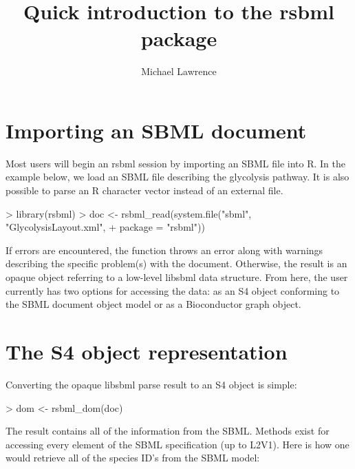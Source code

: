 \documentclass[english]{article}
\begin{document}
\title{Quick introduction to the rsbml package}
\author{Michael Lawrence}

\maketitle

\section*{Importing an SBML document}
Most users will begin an rsbml session by importing an SBML file into R.
In the example below, we load an SBML file describing the glycolysis pathway.
It is also possible to parse an R character vector instead of an external file.

\begin{Schunk}
\begin{Sinput}
> library(rsbml)
> doc <- rsbml_read(system.file("sbml", "GlycolysisLayout.xml", 
+     package = "rsbml"))
\end{Sinput}
\end{Schunk}

If errors are encountered, the function throws an error along with
warnings describing the specific problem(s) with the document.
Otherwise, the result is an opaque object referring to a low-level 
libsbml data structure. From here, the user currently has two options for 
accessing the data: as an S4 object conforming to the SBML document object 
model or as a Bioconductor graph object.

\section*{The S4 object representation}
Converting the opaque libsbml parse result to an S4 object is simple:

\begin{Schunk}
\begin{Sinput}
> dom <- rsbml_dom(doc)
\end{Sinput}
\end{Schunk}

The result contains all of the information from the SBML. Methods exist for
accessing every element of the SBML specification (up to L2V1). Here is how
one would retrieve all of the species ID's from the SBML model:
\end{document}
